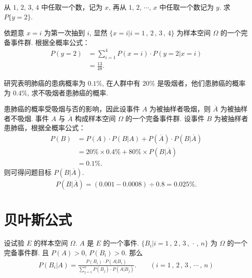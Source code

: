 \documentclass[12pt, a4paper, oneside, UTF8]{ctexbook}
\begin{document}
\begin{example}
    从 \(1\), \(2\), \(3\), \(4\) 中任取一个数，记为 \(x\), 再从 \(1\), \(2\), \(\cdots\), \(x\) 中任取一个数记为 \(y\). 求 \(P\{y = 2\}\).
\end{example}

\begin{solution}
    依题意 \(x = i\) 为第一次抽到 \(i\), 显然 \(\{x = i | i = 1\,,\,2\,,\,3\,,\,4\}\) 为样本空间 \(\Omega\) 的一个完备事件群. 根据全概率公式：
    \begin{align*}
        P\left(y = 2\right) &= \sum_{i = 1}^{4} P\left(x = i\right) \cdot P\left(y = 2 | x = i\right)\\ 
        &= \frac{13}{48}.
    \end{align*}
\end{solution}

\begin{example}
    研究表明肺癌的患病概率为 \(0.1\%\), 在人群中有 \(20\%\) 是吸烟者，他们患肺癌的概率为 \(0.4\%\), 求不吸烟者患肺癌的概率.
\end{example}

\begin{solution}
    患肺癌的概率受吸烟与否的影响，因此设事件 \(A\) 为被抽样者吸烟，则 \(\overline{A}\) 为被抽样者不吸烟. 事件 \(A\) 与 \(\overline{A}\) 构成样本空间 \(\Omega\) 的一个完备事件群. 设事件 \(B\) 为被抽样者患肺癌，根据全概率公式：
    \begin{align*}
        P\left(B\right) &= P\left(A\right) \cdot P\left(B | A\right) + P\left(\overline{A}\right) \cdot P\left(B | \overline{A}\right) \\
        &= 20\% \times 0.4\% + 80\%\times P\left(B | \overline{A}\right)\\
        &= 0.1\%.
    \end{align*}
    则可得问题目标 \(P\left(B|\overline{A}\right)\).
    \begin{align*}
        P\left(B|\overline{A}\right) = (0.001 - 0.0008) \div 0.8 = 0.025\%.
    \end{align*}
\end{solution}

\section{贝叶斯公式}

\begin{thm}
    设试验 \(E\) 的样本空间 \(\Omega\). \(A\) 是 \(E\) 的一个事件. \(\{B_i | i = 1\,,\,2\,,\,3\,,\,\cdot\,,\,n\}\) 为 \(\Omega\) 的一个完备事件群. 且 \(P\left(A\right) > 0\), \(P\left(B_i\right) > 0\). 那么
    \begin{align*}
        P\left(B_i | A\right) = \frac{P\left(B_i\right) \cdot P\left(A | B_i\right)}{\sum_{j = 1}^{n}P\left(B_j\right) \cdot P\left(A | B_j\right)}. \qquad \left(i = 1\,,\,2\,,\,3\,,\,\cdots\,,\,n\right)
    \end{align*}
\end{thm}
\end{document}
